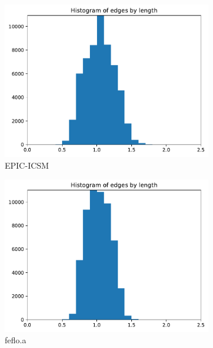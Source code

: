 \documentclass[3p,times,procedia,number]{elsarticle}
\begin{document}
\begin{figure}
\begin{subfigure}{.16\textwidth}
\end{subfigure}
\begin{subfigure}{.16\textwidth}
\centering
\includegraphics[width=\textwidth]{epic-icsm-cube-linear-length.pdf}
\caption{EPIC-ICSM}
\end{subfigure}
\begin{subfigure}{.16\textwidth}
\centering
\includegraphics[width=\textwidth]{fefloa-cube-linear-length.pdf}
\caption{feflo.a}
\end{subfigure}
\begin{subfigure}{.16\textwidth}
\centering

\end{subfigure}
\end{figure}
\end{document}

